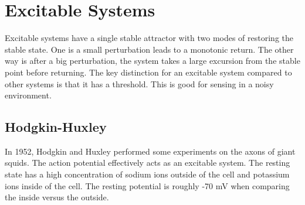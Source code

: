 \documentclass{article}
\theoremstyle{definition}
\begin{document}
\section{Excitable Systems}
Excitable systems have a single stable attractor with two modes of restoring the stable state. One is a small perturbation leads to a monotonic return. The other way is after a big perturbation, the system takes a large excursion from the stable point before returning. The key distinction for an excitable system compared to other systems is that it has a threshold. This is good for sensing in a noisy environment. 
\subsection{Hodgkin-Huxley}
In 1952, Hodgkin and Huxley performed some experiments on the axons of giant squids. The action potential effectively acts as an excitable system. The resting state has a high concentration of sodium ions outside of the cell and potassium ions inside of the cell. The resting potential is roughly -70 mV when comparing the inside versus the outside.
\end{document}

